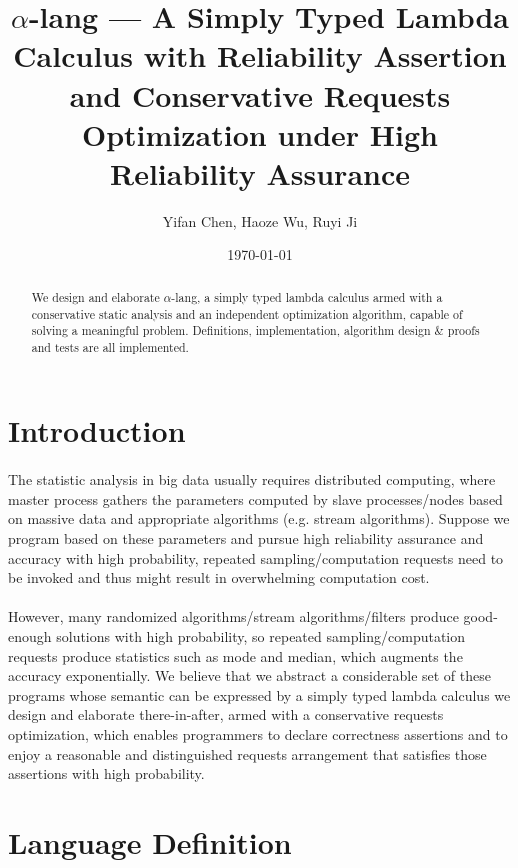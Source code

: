 \documentclass[a4paper]{article}
\title{$\alpha$-lang --- A Simply Typed Lambda Calculus with Reliability Assertion and Conservative Requests Optimization under High Reliability Assurance}
\author{Yifan Chen, Haoze Wu, Ruyi Ji}
\date{\today}
\begin{document}
\maketitle

\begin{abstract}
We design and elaborate $\alpha$-lang, a simply typed lambda calculus armed with a conservative static analysis and an independent optimization algorithm, capable of solving a meaningful problem. Definitions, implementation, algorithm design \& proofs and tests are all implemented. %
\end{abstract}

\section{Introduction}
\paragraph{}
The statistic analysis in big data usually requires distributed computing, where master process gathers the parameters computed by slave processes/nodes based on massive data and appropriate algorithms (e.g. stream algorithms). Suppose we program based on these parameters and pursue high reliability assurance and accuracy with high probability, repeated sampling/computation requests need to be invoked and thus might result in overwhelming computation cost.
\paragraph{}
However, many randomized algorithms/stream algorithms/filters produce good-enough solutions with high probability, so repeated sampling/computation requests produce statistics such as mode and median, which augments the accuracy exponentially. We believe that we abstract a considerable set of these programs whose semantic can be expressed by a simply typed lambda calculus we design and elaborate there-in-after, armed with a conservative requests optimization, which enables programmers to declare correctness assertions and to enjoy a reasonable and distinguished requests arrangement that satisfies those assertions with high probability.
\section{Language Definition}
\end{document}
